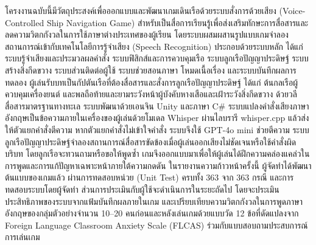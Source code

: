 โครงงานฉบับนี้มีวัตถุประสงค์เพื่อออกแบบและพัฒนาเกมเดินเรือด้วยระบบสั่งการด้วยเสียง (Voice-Controlled Ship Navigation Game) สำหรับเป็นสื่อการเรียนรู้เพื่อส่งเสริมทักษะการสื่อสารและลดความวิตกกังวลในการใช้ภาษาต่างประเทศของผู้เรียน โดยระบบผสมผสานรูปแบบเกมจำลองสถานการณ์เข้ากับเทคโนโลยีการรู้จำเสียง (Speech Recognition) ประกอบด้วยระบบหลัก ได้แก่ ระบบรู้จำเสียงและประมวลผลคำสั่ง ระบบฟิสิกส์และการควบคุมเรือ ระบบลูกเรือปัญญาประดิษฐ์ ระบบสร้างสิ่งกีดขวาง ระบบส่วนติดต่อผู้ใช้ ระบบช่วยสอนภาษา โหมดเนื้อเรื่อง และระบบบันทึกผลการทดลอง ผู้เล่นรับบทเป็นกัปตันเรือที่ต้องสื่อสารและสั่งการลูกเรือปัญญาประดิษฐ์ ได้แก่ ต้นกลเรือผู้ควบคุมเครื่องยนต์ และพลถือท้ายและยามระวังหน้าผู้บังคับหางเสือและเฝ้าระวังสิ่งกีดขวาง ด้วยวลีสื่อสารมาตรฐานทางทะเล ระบบพัฒนาด้วยเอนจิน Unity และภาษา C\# ระบบแปลงคำสั่งเสียงภาษาอังกฤษเป็นข้อความภายในเครื่องของผู้เล่นด้วยโมเดล Whisper ผ่านไลบรารี whisper.cpp แล้วส่งให้ตัวแยกคำสั่งตีความ หากตัวแยกคำสั่งไม่เข้าใจคำสั่ง ระบบจึงใช้ GPT-4o mini ช่วยตีความ ระบบลูกเรือปัญญาประดิษฐ์จำลองสถานการณ์สื่อสารขัดข้องเมื่อผู้เล่นออกเสียงไม่ชัดเจนหรือใช้คำสั่งผิดบริบท โดยลูกเรือจะทวนถามหรือขอให้พูดซ้ำ เกมจึงออกแบบมาเพื่อให้ผู้เล่นได้ฝึกความคล่องแคล่วในการพูดและการแก้ปัญหาเฉพาะหน้าภายใต้ความกดดัน ในรายงานความก้าวหน้าครั้งนี้ ผู้จัดทำได้พัฒนาต้นแบบของเกมแล้ว ผ่านการทดสอบหน่วย (Unit Test) ครบทั้ง 363 จาก 363 กรณี และการทดสอบระบบโดยผู้จัดทำ ส่วนการประเมินกับผู้ใช้จะดำเนินการในระยะถัดไป โดยจะประเมินประสิทธิภาพของระบบจากแฟ้มบันทึกผลภายในเกม และเปรียบเทียบความวิตกกังวลในการพูดภาษาอังกฤษของกลุ่มตัวอย่างจำนวน 10--20 คนก่อนและหลังเล่นเกมด้วยแบบวัด 12 ข้อที่ดัดแปลงจาก Foreign Language Classroom Anxiety Scale (FLCAS) ร่วมกับแบบสอบถามประสบการณ์การเล่นเกม
